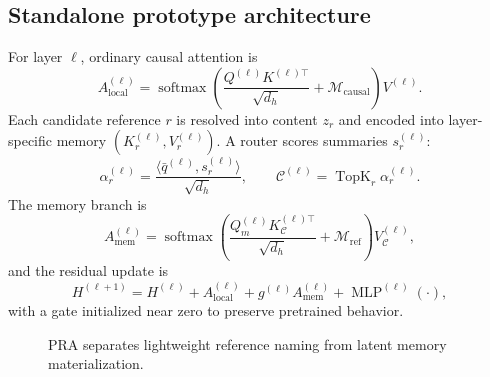 \documentclass[10pt,a4paper]{article}
\begin{document}
\subsection{Standalone prototype architecture}
For layer $\ell$, ordinary causal attention is
\begin{equation}
A^{(\ell)}_{\mathrm{local}}=\operatorname{softmax}\left(\frac{Q^{(\ell)}K^{(\ell)\top}}{\sqrt{d_h}}+\mathcal{M}_{\mathrm{causal}}\right)V^{(\ell)}.
\end{equation}
Each candidate reference $r$ is resolved into content $z_r$ and encoded into layer-specific memory $(K_r^{(\ell)},V_r^{(\ell)})$. A router scores summaries $s_r^{(\ell)}$:
\begin{equation}
\alpha_r^{(\ell)} = \frac{\langle \bar q^{(\ell)},s_r^{(\ell)}\rangle}{\sqrt{d_h}}, \qquad \mathcal{C}^{(\ell)}=\operatorname{TopK}_r \alpha_r^{(\ell)}.
\end{equation}
The memory branch is
\begin{equation}
A^{(\ell)}_{\mathrm{mem}}=\operatorname{softmax}\left(\frac{Q_m^{(\ell)}K_{\mathcal{C}}^{(\ell)\top}}{\sqrt{d_h}}+\mathcal{M}_{\mathrm{ref}}\right)V_{\mathcal{C}}^{(\ell)},
\end{equation}
and the residual update is
\begin{equation}
H^{(\ell+1)}=H^{(\ell)}+A^{(\ell)}_{\mathrm{local}}+g^{(\ell)}A^{(\ell)}_{\mathrm{mem}}+\operatorname{MLP}^{(\ell)}(\cdot),
\end{equation}
with a gate initialized near zero to preserve pretrained behavior.

\begin{figure}[h]
\centering
{}
\caption{PRA separates lightweight reference naming from latent memory materialization.}
\end{figure}
\end{document}
